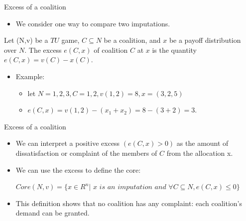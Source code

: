 \documentclass{beamer}
\begin{document}
\begin{frame}{Excess of a coalition}
    \begin{itemize}
        \item We consider one way to compare two imputations.
    \end{itemize}

    \begin{definition} \label{dfn:marginalcontribution}
        Let (N,v) be a $TU$ game, $C \subseteq N$ be a coalition, and $x$ be a payoff distribution over $N$. The excess $e(C,x)$ of coalition $C$ at $x$ is the quantity $e(C,x) = v(C) - x(C)$.
    \end{definition}

    \begin{itemize}
        \item Example:
        \begin{itemize}
            \item let $N={1,2,3}, C={1,2}, v({1,2})=8, x=(3,2,5)$
            \item $e(C,x)=v({1,2})-(x_1 + x_2)=8-(3+2)=3.$
        \end{itemize}
    \end{itemize}

\end{frame}

\begin{frame}{Excess of a coalition}

    \begin{itemize}
        \item We can interpret a positive excess $(e(C,x) > 0)$ as the amount of dissatisfaction or {\color{blue} complaint} of the members of $C$ from the allocation x.
        \item We can use the excess to define the core:
        \begin{center}
            $Core(N,v)=\{x \in R^n |$ $x$ $is$ $an$ $imputation$ $and$ $\forall C \subseteq N, e(C,x) \leq 0\}$
        \end{center}
        \item This definition shows that no coalition has any complaint: each coalition's demand can be granted.
    \end{itemize}

\end{frame}
\end{document}

